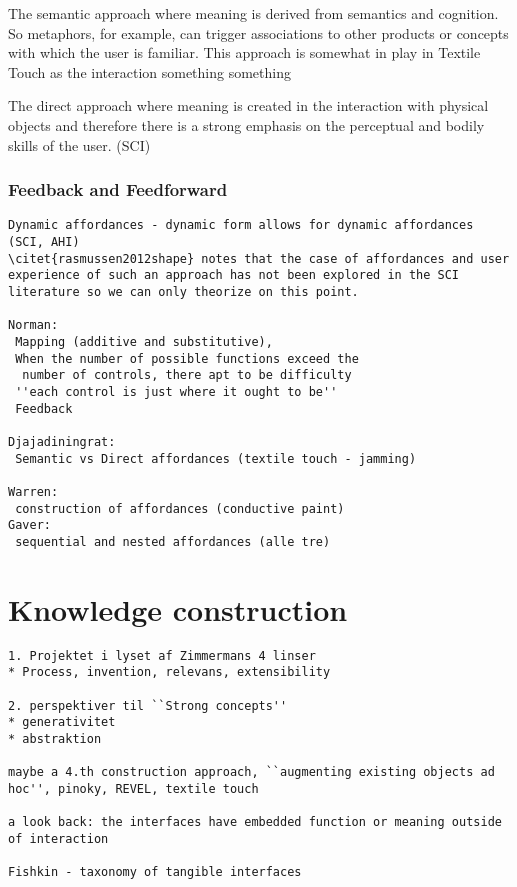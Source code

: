 The semantic approach where meaning is derived from semantics and cognition.
So metaphors, for example, can trigger associations to other products or concepts with which the user is familiar.
This approach is somewhat in play in Textile Touch as the interaction something something

The direct approach where meaning is created in the interaction with physical objects and therefore there is a strong emphasis on the perceptual and bodily skills of the user.
(SCI)
\blank
\subsubsection{Feedback and Feedforward}
\begin{verbatim}
Dynamic affordances - dynamic form allows for dynamic affordances (SCI, AHI)
\citet{rasmussen2012shape} notes that the case of affordances and user experience of such an approach has not been explored in the SCI literature so we can only theorize on this point.

Norman: 
 Mapping (additive and substitutive), 
 When the number of possible functions exceed the 
  number of controls, there apt to be difficulty
 ''each control is just where it ought to be''
 Feedback 

Djajadiningrat:
 Semantic vs Direct affordances (textile touch - jamming)

Warren:
 construction of affordances (conductive paint) 
Gaver:
 sequential and nested affordances (alle tre)
\end{verbatim}


\section{Knowledge construction}

\begin{verbatim}
1. Projektet i lyset af Zimmermans 4 linser
* Process, invention, relevans, extensibility

2. perspektiver til ``Strong concepts''
* generativitet
* abstraktion

maybe a 4.th construction approach, ``augmenting existing objects ad hoc'', pinoky, REVEL, textile touch

a look back: the interfaces have embedded function or meaning outside of interaction

Fishkin - taxonomy of tangible interfaces
\end{verbatim}

